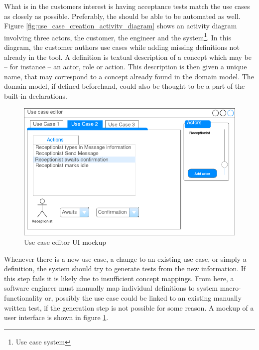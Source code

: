 What is in the customers interest is having acceptance tests match the use cases as closely as possible. Preferably, the should be able to be automated as well. Figure \ref{fig:use_case_creation_activity_diagram} shows an activity diagram involving three actors, the customer, the engineer and the system\footnote{Use case system}. In this diagram, the customer authors use cases while adding missing definitions not already in the tool. A definition is textual description of a concept which may be -- for instance -- an actor, role or action. This description is then given a unique name, that may correspond to a concept already found in the domain model. The domain model, if defined beforehand, could also be thought to be a part of the built-in declarations.

\begin{figure}[h]
\includegraphics[scale=0.9]{img/test_case_ui}
\centering
\caption{Use case editor UI mockup}
\label{fig:use_case_editor_mockup}
\end{figure}

Whenever there is a new use case, a change to an existing use case, or simply a definition, the system should try to generate tests from the new information. If this step fails it is likely due to insufficient concept mappings. From here, a software engineer must manually map individual definitions to system macro-functionality or, possibly the use case could be linked to an existing manually written test, if the generation step is not possible for some reason. A mockup of a user interface is shown in figure \ref{fig:use_case_editor_mockup}.


